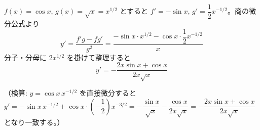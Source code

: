 
$f(x) = \cos x$, $g(x) = \sqrt{x} = x^{1/2}$ とすると $f' = -\sin x$, $g' = \dfrac{1}{2}x^{-1/2}$。商の微分公式より
\[
y' = \frac{f'g - fg'}{g^{2}}
= \frac{-\sin x\cdot x^{1/2} - \cos x\cdot \dfrac{1}{2}x^{-1/2}}{x}
\]
分子・分母に $2x^{1/2}$ を掛けて整理すると
\[
\boxed{\; y' = -\dfrac{2x\sin x + \cos x}{2x\sqrt{x}} \;}
\]

（検算: $y=\cos x\,x^{-1/2}$ を直接微分すると
$y' = -\sin x\,x^{-1/2} + \cos x\cdot\left(-\dfrac{1}{2}\right)x^{-3/2}
= -\dfrac{\sin x}{\sqrt{x}} - \dfrac{\cos x}{2x\sqrt{x}}
= -\dfrac{2x\sin x + \cos x}{2x\sqrt{x}}$ となり一致する。）
